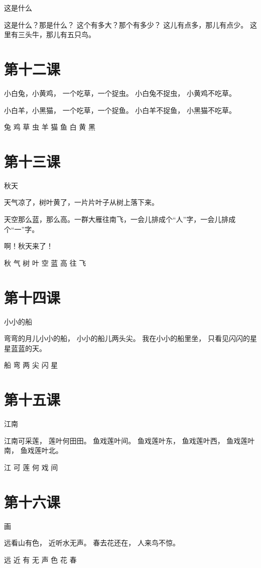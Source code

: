 \documentclass[12pt,UTF8]{ctexbook}
\begin{document}
这是什么

这是什么？那是什么？
这个有多大？那个有多少？
这儿有点多，那儿有点少。
这里有三头牛，那儿有五只鸟。

\section{第十二课}

小白兔，小黄鸡，
一个吃草，一个捉虫。
小白兔不捉虫，
小黄鸡不吃草。

小白羊，小黑猫，
一个吃草，一个捉鱼。
小白羊不捉鱼，
小黑猫不吃草。

兔 鸡 草 虫 羊 猫 鱼 白 黄 黑

\section{第十三课}

秋天

天气凉了，树叶黄了，一片片叶子从树上落下来。

天空那么蓝，那么高。一群大雁往南飞，一会儿排成个“人”字，一会儿排成个“一”字。

啊！秋天来了！

秋 气 树 叶 空 蓝 高 往 飞

\section{第十四课}

小小的船

弯弯的月儿小小的船，
小小的船儿两头尖。
我在小小的船里坐，
只看见闪闪的星星蓝蓝的天。

船 弯 两 尖 闪 星

\section{第十五课}

江南

江南可采莲，
莲叶何田田。
鱼戏莲叶间。
鱼戏莲叶东，
鱼戏莲叶西，
鱼戏莲叶南，
鱼戏莲叶北。

江 可 莲 何 戏 间

\section{第十六课}

画

远看山有色，
近听水无声。
春去花还在，
人来鸟不惊。

远 近 有 无 声 色 花 春
\end{document}
